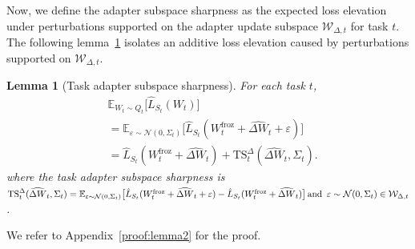 \documentclass[10pt]{article} %
\newtheorem{lemma}{Lemma}
\begin{document}
 
Now, we define the adapter subspace sharpness as the expected loss elevation under perturbations supported on the adapter update subspace $\mathcal W_{\Delta,t}$ for task $t$. The following lemma~\ref{lem:subspace-loss-pecl} isolates an additive loss elevation caused by perturbations supported on $\mathcal W_{\Delta,t}$.

\begin{lemma}[Task adapter subspace sharpness]
\label{lem:subspace-loss-pecl}
For each task $t$,
{%
\setlength{\abovedisplayskip}{1pt}
\setlength{\belowdisplayskip}{2pt}
\setlength{\abovedisplayshortskip}{1pt}
\setlength{\belowdisplayshortskip}{2pt}
\begin{equation*}
\label{eq:subspace-loss-pecl}
\begin{aligned}
&\mathbb E_{W_t\sim Q_t}\bigl[\hat L_{S_t}(W_t)\bigr] \\
&= \mathbb{E}_{\varepsilon\sim\mathcal N(0,\Sigma_t)}
    \big[\hat{L}_{S_t}(W^{\mathrm{froz}}_t+\widehat{\Delta W}_t+\varepsilon)\big] \\
& =\hat L_{S_t}(W^{\mathrm{froz}}_t + \widehat{\Delta W}_t)
+
\mathrm{TS}_t^{\Delta}(\widehat{\Delta W}_t,\Sigma_t).
\end{aligned}
\end{equation*}
}where the task adapter subspace sharpness is $
\mathrm{TS}_t^{\Delta}(\widehat{\Delta W}_t,\Sigma_t)
= \mathbb{E}_{\varepsilon\sim\mathcal N(0,\Sigma_t)}
   \big[\hat{L}_{S_t}(W^{\mathrm{froz}}_t+\widehat{\Delta W}_t+\varepsilon)
   - \hat{L}_{S_t}(W^{\mathrm{froz}}_t+\widehat{\Delta W}_t)\big] \text{\,and\, } 
     \varepsilon\sim\mathcal N(0,\Sigma_t) \in  \mathcal W_{\Delta,t}$.
     \end{lemma}

We refer to Appendix~\ref{proof:lemma2} for the proof.
\end{document}
